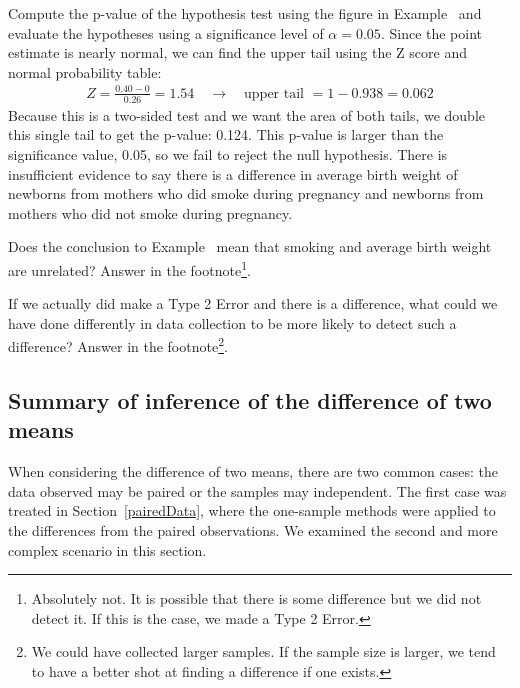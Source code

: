 \begin{example}{Compute the p-value of the hypothesis test using the figure in Example~ and evaluate the hypotheses using a significance level of $\alpha=0.05$.} \label{babySmokeHTForWeightComputePValueAndEvalHT}
Since the point estimate is nearly normal, we can find the upper tail using the Z score and normal probability table:
\begin{eqnarray*}
Z = \frac{0.40 - 0}{0.26} = 1.54 \quad \to \quad \text{upper tail } = 1 - 0.938 = 0.062
\end{eqnarray*}
Because this is a two-sided test and we want the area of both tails, we double this single tail to get the p-value: 0.124. This p-value is larger than the significance value, 0.05, so we fail to reject the null hypothesis. There is insufficient evidence to say there is a difference in average birth weight of newborns from mothers who did smoke during pregnancy and newborns from mothers who did not smoke during pregnancy.
\end{example}

\begin{exercise}
Does the conclusion to Example~ mean that smoking and average birth weight are unrelated? Answer in the footnote\footnote{Absolutely not. It is possible that there is some difference but we did not detect it. If this is the case, we made a Type 2 Error.}.
\end{exercise}

\begin{exercise} \label{babySmokeHTIDingHowToDetectDifferences}
If we actually did make a Type 2 Error and there is a difference, what could we have done differently in data collection to be more likely to detect such a difference? Answer in the footnote\footnote{We could have collected larger samples. If the sample size is larger, we tend to have a better shot at finding a difference if one exists.}.
\end{exercise}

\subsection{Summary of inference of the difference of two means}

When considering the difference of two means, there are two common cases: the data observed may be paired or the samples may independent. The first case was treated in Section~\ref{pairedData}, where the one-sample methods were applied to the differences from the paired observations. We examined the second and more complex scenario in this section.

